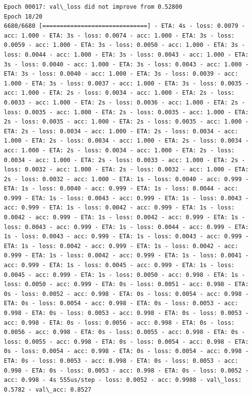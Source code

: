 \documentclass[11pt]{article}
\begin{document}
\begin{Verbatim}[commandchars=\\\{\}]
Epoch 00017: val\_loss did not improve from 0.52800
Epoch 18/20
6680/6680 [==============================] - ETA: 4s - loss: 0.0079 - acc: 1.000 - ETA: 3s - loss: 0.0074 - acc: 1.000 - ETA: 3s - loss: 0.0059 - acc: 1.000 - ETA: 3s - loss: 0.0050 - acc: 1.000 - ETA: 3s - loss: 0.0044 - acc: 1.000 - ETA: 3s - loss: 0.0043 - acc: 1.000 - ETA: 3s - loss: 0.0040 - acc: 1.000 - ETA: 3s - loss: 0.0043 - acc: 1.000 - ETA: 3s - loss: 0.0040 - acc: 1.000 - ETA: 3s - loss: 0.0039 - acc: 1.000 - ETA: 3s - loss: 0.0037 - acc: 1.000 - ETA: 3s - loss: 0.0035 - acc: 1.000 - ETA: 2s - loss: 0.0034 - acc: 1.000 - ETA: 2s - loss: 0.0033 - acc: 1.000 - ETA: 2s - loss: 0.0036 - acc: 1.000 - ETA: 2s - loss: 0.0035 - acc: 1.000 - ETA: 2s - loss: 0.0035 - acc: 1.000 - ETA: 2s - loss: 0.0035 - acc: 1.000 - ETA: 2s - loss: 0.0035 - acc: 1.000 - ETA: 2s - loss: 0.0034 - acc: 1.000 - ETA: 2s - loss: 0.0034 - acc: 1.000 - ETA: 2s - loss: 0.0034 - acc: 1.000 - ETA: 2s - loss: 0.0034 - acc: 1.000 - ETA: 2s - loss: 0.0034 - acc: 1.000 - ETA: 2s - loss: 0.0034 - acc: 1.000 - ETA: 2s - loss: 0.0033 - acc: 1.000 - ETA: 2s - loss: 0.0032 - acc: 1.000 - ETA: 2s - loss: 0.0032 - acc: 1.000 - ETA: 2s - loss: 0.0032 - acc: 1.000 - ETA: 1s - loss: 0.0040 - acc: 0.999 - ETA: 1s - loss: 0.0040 - acc: 0.999 - ETA: 1s - loss: 0.0044 - acc: 0.999 - ETA: 1s - loss: 0.0043 - acc: 0.999 - ETA: 1s - loss: 0.0043 - acc: 0.999 - ETA: 1s - loss: 0.0042 - acc: 0.999 - ETA: 1s - loss: 0.0042 - acc: 0.999 - ETA: 1s - loss: 0.0042 - acc: 0.999 - ETA: 1s - loss: 0.0043 - acc: 0.999 - ETA: 1s - loss: 0.0044 - acc: 0.999 - ETA: 1s - loss: 0.0043 - acc: 0.999 - ETA: 1s - loss: 0.0043 - acc: 0.999 - ETA: 1s - loss: 0.0042 - acc: 0.999 - ETA: 1s - loss: 0.0042 - acc: 0.999 - ETA: 1s - loss: 0.0042 - acc: 0.999 - ETA: 1s - loss: 0.0041 - acc: 0.999 - ETA: 1s - loss: 0.0045 - acc: 0.999 - ETA: 1s - loss: 0.0045 - acc: 0.999 - ETA: 1s - loss: 0.0050 - acc: 0.998 - ETA: 1s - loss: 0.0050 - acc: 0.999 - ETA: 0s - loss: 0.0051 - acc: 0.998 - ETA: 0s - loss: 0.0052 - acc: 0.998 - ETA: 0s - loss: 0.0054 - acc: 0.998 - ETA: 0s - loss: 0.0054 - acc: 0.998 - ETA: 0s - loss: 0.0053 - acc: 0.998 - ETA: 0s - loss: 0.0053 - acc: 0.998 - ETA: 0s - loss: 0.0053 - acc: 0.998 - ETA: 0s - loss: 0.0056 - acc: 0.998 - ETA: 0s - loss: 0.0056 - acc: 0.998 - ETA: 0s - loss: 0.0055 - acc: 0.998 - ETA: 0s - loss: 0.0055 - acc: 0.998 - ETA: 0s - loss: 0.0054 - acc: 0.998 - ETA: 0s - loss: 0.0054 - acc: 0.998 - ETA: 0s - loss: 0.0054 - acc: 0.998 - ETA: 0s - loss: 0.0053 - acc: 0.998 - ETA: 0s - loss: 0.0053 - acc: 0.998 - ETA: 0s - loss: 0.0053 - acc: 0.998 - ETA: 0s - loss: 0.0052 - acc: 0.998 - 4s 555us/step - loss: 0.0052 - acc: 0.9988 - val\_loss: 0.5782 - val\_acc: 0.8527


\end{Verbatim}
\end{document}
